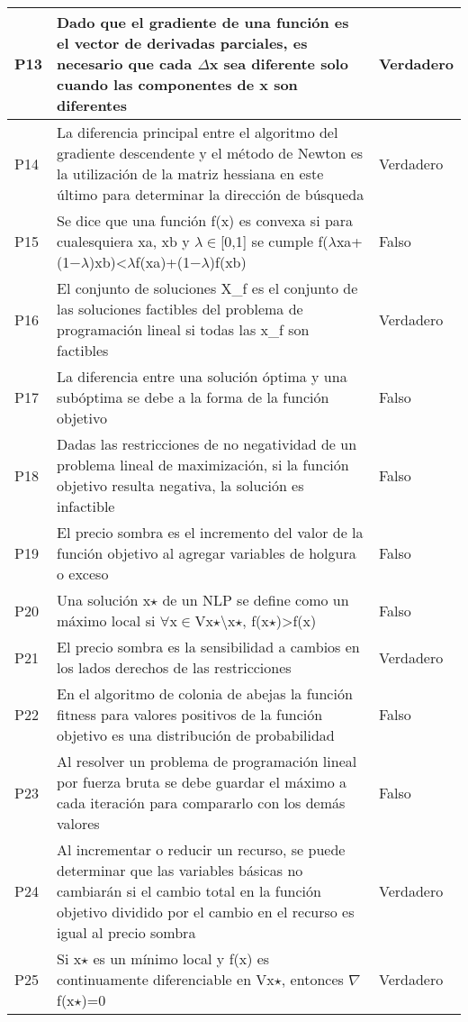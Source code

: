 \documentclass{article}
\begin{document}
\begin{longtable}{|p{1.5cm}|p{14cm}|p{2cm}|}
P13 & Dado que el gradiente de una función es el vector de derivadas parciales, es necesario que cada $\Delta$x sea diferente solo cuando las componentes de x son diferentes & Verdadero \\ \hline
P14 & La diferencia principal entre el algoritmo del gradiente descendente y el método de Newton es la utilización de la matriz hessiana en este último para determinar la dirección de búsqueda & Verdadero \\ \hline
P15 & Se dice que una función f(x) es convexa si para cualesquiera xa, xb y $\lambda$$\in$[0,1] se cumple f($\lambda$xa+(1−$\lambda$)xb)<$\lambda$f(xa)+(1−$\lambda$)f(xb) & Falso \\ \hline
P16 & El conjunto de soluciones X\_f es el conjunto de las soluciones factibles del problema de programación lineal si todas las x\_f son factibles & Verdadero \\ \hline
P17 & La diferencia entre una solución óptima y una subóptima se debe a la forma de la función objetivo & Falso \\ \hline
P18 & Dadas las restricciones de no negatividad de un problema lineal de maximización, si la función objetivo resulta negativa, la solución es infactible & Falso \\ \hline
P19 & El precio sombra es el incremento del valor de la función objetivo al agregar variables de holgura o exceso & Falso \\ \hline
P20 & Una solución x$\star$ de un NLP se define como un máximo local si $\forall$x$\in$Vx$\star$$\setminus$x$\star$, f(x$\star$)>f(x) & Falso \\ \hline
P21 & El precio sombra es la sensibilidad a cambios en los lados derechos de las restricciones & Verdadero \\ \hline
P22 & En el algoritmo de colonia de abejas la función fitness para valores positivos de la función objetivo es una distribución de probabilidad & Falso \\ \hline
P23 & Al resolver un problema de programación lineal por fuerza bruta se debe guardar el máximo a cada iteración para compararlo con los demás valores & Falso \\ \hline
P24 & Al incrementar o reducir un recurso, se puede determinar que las variables básicas no cambiarán si el cambio total en la función objetivo dividido por el cambio en el recurso es igual al precio sombra & Verdadero \\ \hline
P25 & Si x$\star$ es un mínimo local y f(x) es continuamente diferenciable en Vx$\star$, entonces $\nabla$f(x$\star$)=0 & Verdadero \\ \hline

\end{longtable}
\end{document}
